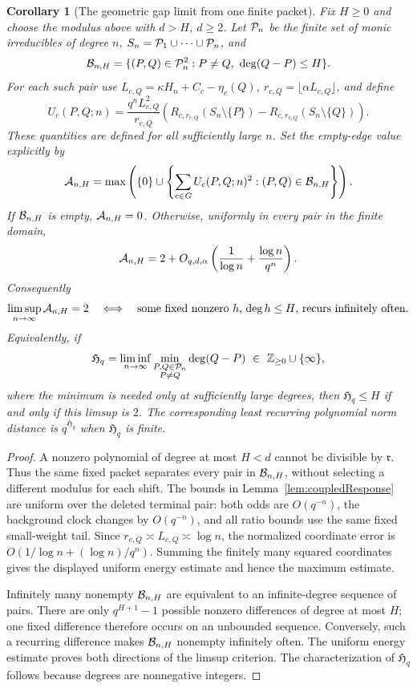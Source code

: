 \documentclass[11pt]{article}
\newtheorem{corollary}[theorem]{Corollary}
\begin{document}
\begin{corollary}[The geometric gap limit from one finite packet]
\label{cor:packetGapLimit}
Fix \(H\geq0\) and choose the modulus above with \(d>H\), \(d\geq2\).
Let \({\cal P}_n\) be the finite set of monic irreducibles of degree \(n\),
\(S_n={\cal P}_1\cup\cdots\cup{\cal P}_n\), and
\[
 {\cal B}_{n,H}=\{(P,Q)\in{\cal P}_n^2:
                   P\ne Q,\ \deg(Q-P)\leq H\}.
\]
For each such pair use
\(L_{c,Q}=\kappa H_n+C_c-\eta_c(Q)\),
\(r_{c,Q}=\lfloor\alpha L_{c,Q}\rfloor\), and define
\[
 U_c(P,Q;n)=\frac{q^n L_{c,Q}^2}{r_{c,Q}}
 \left(R_{c,r_{c,Q}}(S_n\setminus\{P\})
             -R_{c,r_{c,Q}}(S_n\setminus\{Q\})\right).
\]
These quantities are defined for all sufficiently large \(n\).
Set the empty-edge value explicitly by
\[
 {\cal A}_{n,H}=\max\left(\{0\}\cup
       \left\{\sum_{c\in G}U_c(P,Q;n)^2:
                              (P,Q)\in{\cal B}_{n,H}\right\}\right).
\]
If \({\cal B}_{n,H}\) is empty, \({\cal A}_{n,H}=0\).
Otherwise, uniformly in every pair in the finite domain,
\[
 {\cal A}_{n,H}=2+
 O_{q,d,\alpha}\left(\frac1{\log n}+\frac{\log n}{q^n}\right).
\]
Consequently
\[
 \limsup_{n\to\infty}{\cal A}_{n,H}=2
 \quad\Longleftrightarrow\quad
 \text{some fixed nonzero \(h\), \(\deg h\leq H\), recurs infinitely often}.
\]
Equivalently, if
\[
 {\mathfrak H}_q=
 \liminf_{n\to\infty}
     \min_{\substack{P,Q\in{\cal P}_n\\P\ne Q}}\deg(Q-P)
       \ \in\ \mathbb Z_{\geq0}\cup\{\infty\},
\]
where the minimum is needed only at sufficiently large degrees,
then \({\mathfrak H}_q\leq H\) if and only if this limsup is \(2\).
The corresponding least recurring polynomial norm distance is
\(q^{{\mathfrak H}_q}\) when \({\mathfrak H}_q\) is finite.
\end{corollary}
\begin{proof}
A nonzero polynomial of degree at most \(H<d\) cannot be divisible
by \(\mathfrak r\). Thus the same fixed packet separates every pair
in \({\cal B}_{n,H}\), without selecting a different modulus for
each shift. The bounds in Lemma~\ref{lem:coupledResponse} are uniform
over the deleted terminal pair: both odds are \(O(q^{-n})\), the
background clock changes by \(O(q^{-n})\), and all ratio bounds use
the same fixed small-weight tail. Since \(r_{c,Q}\asymp L_{c,Q}
\asymp\log n\), the normalized coordinate error is
\(O(1/\log n+(\log n)/q^n)\). Summing the finitely many squared
coordinates gives the displayed uniform energy estimate and hence
the maximum estimate.

Infinitely many nonempty \({\cal B}_{n,H}\) are equivalent to an
infinite-degree sequence of pairs. There are only
\(q^{H+1}-1\) possible nonzero differences of degree at most \(H\);
one fixed difference therefore occurs on an unbounded sequence.
Conversely, such a recurring difference makes \({\cal B}_{n,H}\)
nonempty infinitely often. The uniform energy estimate proves both
directions of the limsup criterion. The characterization of
\({\mathfrak H}_q\) follows because degrees are nonnegative integers.
\end{proof}
\end{document}
